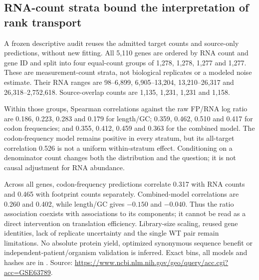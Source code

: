 \subsection{RNA-count strata bound the interpretation of rank transport}
A frozen descriptive audit reuses the admitted target counts and source-only predictions, without new fitting. All 5,110 genes are ordered by RNA count and gene ID and split into four equal-count groups of 1,278, 1,278, 1,277 and 1,277. These are measurement-count strata, not biological replicates or a modeled noise estimate. Their RNA ranges are 98--6,899, 6,905--13,204, 13,210--26,317 and 26,318--2,752,618. Source-overlap counts are 1,135, 1,231, 1,231 and 1,158.

Within those groups, Spearman correlations against the raw FP/RNA log ratio are 0.186, 0.223, 0.283 and 0.179 for length/GC; 0.359, 0.462, 0.510 and 0.417 for codon frequencies; and 0.355, 0.412, 0.459 and 0.363 for the combined model. The codon-frequency model remains positive in every stratum, but its all-target correlation 0.526 is not a uniform within-stratum effect. Conditioning on a denominator count changes both the distribution and the question; it is not causal adjustment for RNA abundance.

Across all genes, codon-frequency predictions correlate 0.317 with RNA counts and 0.465 with footprint counts separately. Combined-model correlations are 0.260 and 0.402, while length/GC gives $-0.150$ and $-0.040$. Thus the ratio association coexists with associations to its components; it cannot be read as a direct intervention on translation efficiency. Library-size scaling, reused gene identities, lack of replicate uncertainty and the single WT pair remain limitations. No absolute protein yield, optimized synonymous sequence benefit or independent-patient/organism validation is inferred. Exact bins, all models and hashes are in . Source: \url{https://www.ncbi.nlm.nih.gov/geo/query/acc.cgi?acc=GSE63789}.
